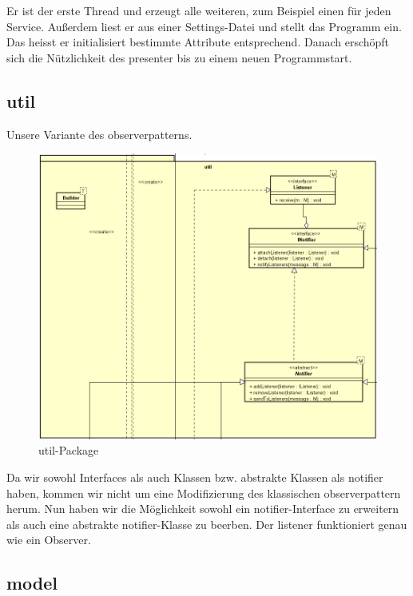 Er ist der erste Thread und erzeugt alle weiteren, zum Beispiel einen für jeden
Service. Außerdem liest er aus einer Settings-Datei und stellt das Programm ein.
Das heisst er initialisiert bestimmte Attribute entsprechend. Danach erschöpft
sich die Nützlichkeit des presenter bis zu einem neuen Programmstart.


\subsection{util}
\label{subsec:util}


Unsere Variante des \gls{observerpattern}s.

\begin{figure}[H]
  \centering
  \includegraphics[width=\textwidth]{../diagramimages/util.png}
  \caption{util-Package}
\end{figure}

Da wir sowohl Interfaces als auch Klassen bzw. abstrakte Klassen als
\gls{notifier} haben, kommen wir nicht um eine Modifizierung des klassischen
\gls{observerpattern} herum. Nun haben wir die Möglichkeit sowohl ein
\gls{notifier}-Interface zu erweitern als auch eine abstrakte
\gls{notifier}-Klasse zu beerben. Der \gls{listener} funktioniert genau wie ein
Observer.


\subsection{model}
\label{subsec:model}

